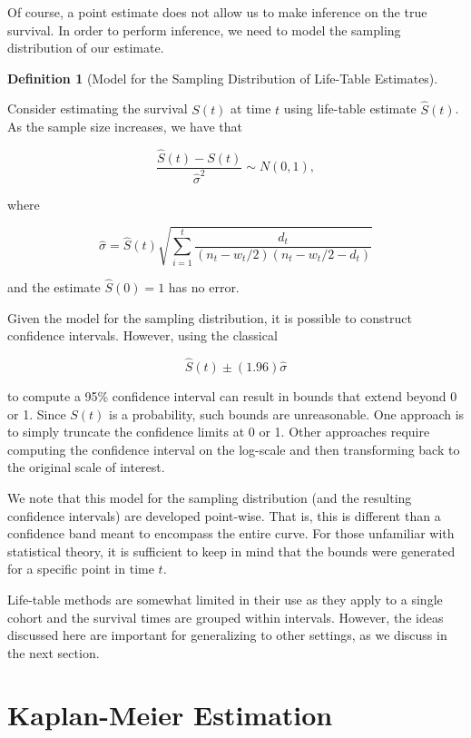 \documentclass[
  letterpaper,
  DIV=11,
  numbers=noendperiod]{scrreprt}
\theoremstyle{definition}
\newtheorem{definition}{Definition}[chapter]
\theoremstyle{definition}
\theoremstyle{remark}
\begin{document}
Of course, a point estimate does not allow us to make inference on the
true survival. In order to perform inference, we need to model the
sampling distribution of our estimate.

\begin{definition}[Model for the Sampling Distribution of Life-Table
Estimates]\protect\hypertarget{def-samp-distn-lifetable}{}\label{def-samp-distn-lifetable}

Consider estimating the survival \(S(t)\) at time \(t\) using life-table
estimate \(\widehat{S}(t)\). As the sample size increases, we have that

\[\frac{\widehat{S}(t) - S(t)}{\widehat{\sigma}^2} \sim N(0, 1),\]

where

\[\widehat{\sigma} = \widehat{S}(t) \sqrt{\sum\limits_{i=1}^t \frac{d_t}{\left(n_{t} - w_t/2\right)\left(n_{t} - w_t/2 - d_t\right)}}\]

and the estimate \(\widehat{S}(0) = 1\) has no error.

\end{definition}

Given the model for the sampling distribution, it is possible to
construct confidence intervals. However, using the classical

\[\widehat{S}(t) \pm (1.96) \widehat{\sigma}\]

to compute a 95\% confidence interval can result in bounds that extend
beyond 0 or 1. Since \(S(t)\) is a probability, such bounds are
unreasonable. One approach is to simply truncate the confidence limits
at 0 or 1. Other approaches require computing the confidence interval on
the log-scale and then transforming back to the original scale of
interest.

We note that this model for the sampling distribution (and the resulting
confidence intervals) are developed point-wise. That is, this is
different than a confidence band meant to encompass the entire curve.
For those unfamiliar with statistical theory, it is sufficient to keep
in mind that the bounds were generated for a specific point in time
\(t\).

Life-table methods are somewhat limited in their use as they apply to a
single cohort and the survival times are grouped within intervals.
However, the ideas discussed here are important for generalizing to
other settings, as we discuss in the next section.

\hypertarget{kaplan-meier-estimation}{%
\section{Kaplan-Meier Estimation}\label{kaplan-meier-estimation}}
\end{document}

